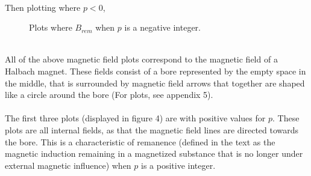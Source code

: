 \documentclass{article}
\begin{document}
\newpage
\\
Then plotting where $p < 0$,
\begin{figure}[h]
\centering
\caption{Plots where $B_{rem}$ when $p$ is a negative integer.}
\end{figure}
\\
All of the above magnetic field plots correspond to the magnetic field of a Halbach magnet. These fields consist of a bore represented by the empty space in the middle, that is surrounded by magnetic field arrows that together are shaped like a circle around the bore (For plots, see appendix 5). 
\\
\\
The first three plots (displayed in figure 4) are with positive values for $p$. These plots are all internal fields, as that the magnetic field lines are directed towards the bore. This is a characteristic of remanence (defined in the text as the magnetic induction remaining in a magnetized substance that is no longer under external magnetic influence) when $p$ is a positive integer.
\end{document}
